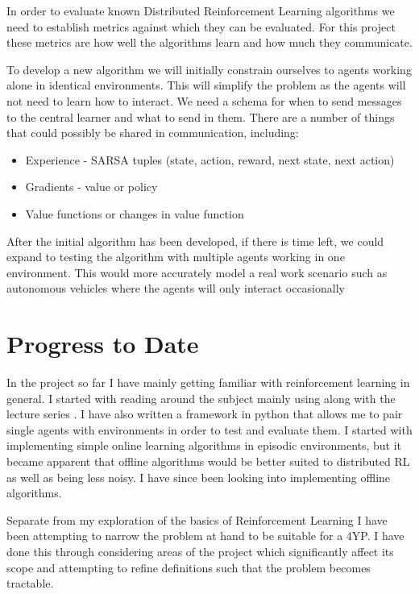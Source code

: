 \documentclass[letterpaper,11pt]{article}
\begin{document}
In order to evaluate known Distributed Reinforcement Learning algorithms  we need to establish metrics against which they can be evaluated.
For this project these metrics are how well the algorithms learn and how much they communicate.

To develop a new algorithm we will initially constrain ourselves to agents working alone in identical environments.
This will simplify the problem as the agents will not need to learn how to interact.
We need a schema for when to send messages to the central learner and what to send in them.
There are a number of things that could possibly be shared in communication, including:

\begin{itemize}
	\item Experience - SARSA tuples (state, action, reward, next state, next action)

	\item Gradients - value or policy
	
	\item Value functions or changes in value function

\end{itemize}

After the initial algorithm has been developed, if there is time left, we could expand to testing the algorithm with multiple agents working in one environment.
This would more accurately model a real work scenario such as autonomous vehicles where the agents will only interact occasionally 

\section{Progress to Date}

In the project so far I have mainly getting familiar with reinforcement learning in general.
I started with reading around the subject mainly using \cite{bertsekas2019reinforcement} along with the lecture series \cite{silver2015}.
I have also written a framework in python that allows me to pair single agents with environments in order to test and evaluate them. 
I started with implementing simple online learning algorithms in episodic environments, but it became apparent that offline algorithms would be better suited to distributed RL as well as being less noisy.
I have since been looking into implementing offline algorithms.

Separate from my exploration of the basics of Reinforcement Learning I have been attempting to narrow the problem at hand to be suitable for a 4YP.
I have done this through considering areas of the project which significantly affect its scope and attempting to refine definitions such that the problem becomes tractable.
	
\end{document}
